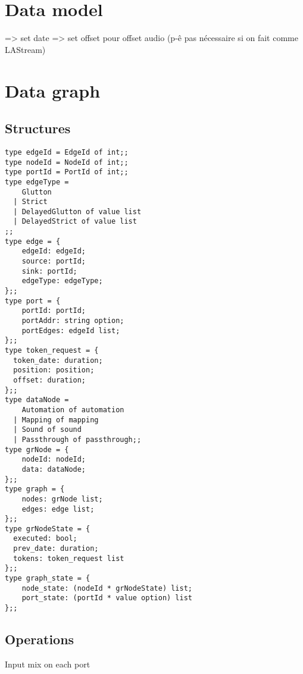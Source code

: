 \documentclass[applsci,article,submit,moreauthors,pdftex,10pt,a4paper]{mdpi}
\begin{document}
\section{Data model}\label{sec.datamodel}
=> set date
=> set offset pour offset audio (p-ê pas nécessaire si on fait comme LAStream)

\section{Data graph}

\subsection{Structures}
\begin{lstlisting}
type edgeId = EdgeId of int;;
type nodeId = NodeId of int;;
type portId = PortId of int;;
type edgeType =
    Glutton
  | Strict
  | DelayedGlutton of value list
  | DelayedStrict of value list
;;
type edge = {
    edgeId: edgeId;
    source: portId;
    sink: portId;
    edgeType: edgeType;
};;
type port = {
    portId: portId;
    portAddr: string option;
    portEdges: edgeId list;
};;
type token_request = {
  token_date: duration;
  position: position;
  offset: duration;
};;
type dataNode =
    Automation of automation
  | Mapping of mapping
  | Sound of sound
  | Passthrough of passthrough;;
type grNode = {
    nodeId: nodeId;
    data: dataNode;
};;
type graph = {
    nodes: grNode list;
    edges: edge list;
};;
type grNodeState = {
  executed: bool;
  prev_date: duration;
  tokens: token_request list
};;
type graph_state = {
    node_state: (nodeId * grNodeState) list;
    port_state: (portId * value option) list
};;
\end{lstlisting}


\subsection{Operations}
Input mix on each port
\end{document}
